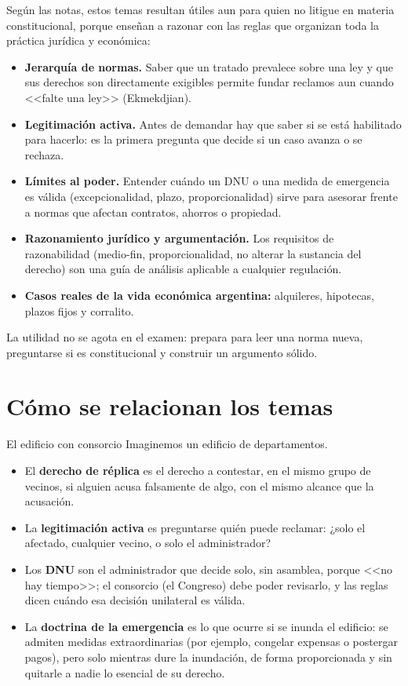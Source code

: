 \documentclass[12pt,oneside]{book}
\begin{document}
Según las notas, estos temas resultan útiles aun para quien no litigue en materia constitucional, porque enseñan a razonar con las reglas que organizan toda la práctica jurídica y económica:

\begin{itemize}
    \item \textbf{Jerarquía de normas.} Saber que un tratado prevalece sobre una ley y que sus derechos son directamente exigibles permite fundar reclamos aun cuando <<falte una ley>> (Ekmekdjian).
    \item \textbf{Legitimación activa.} Antes de demandar hay que saber si se está habilitado para hacerlo: es la primera pregunta que decide si un caso avanza o se rechaza.
    \item \textbf{Límites al poder.} Entender cuándo un DNU o una medida de emergencia es válida (excepcionalidad, plazo, proporcionalidad) sirve para asesorar frente a normas que afectan contratos, ahorros o propiedad.
    \item \textbf{Razonamiento jurídico y argumentación.} Los requisitos de razonabilidad (medio-fin, proporcionalidad, no alterar la sustancia del derecho) son una guía de análisis aplicable a cualquier regulación.
    \item \textbf{Casos reales de la vida económica argentina:} alquileres, hipotecas, plazos fijos y corralito.
\end{itemize}

La utilidad no se agota en el examen: prepara para leer una norma nueva, preguntarse si es constitucional y construir un argumento sólido.

\section{Cómo se relacionan los temas}

\begin{example}{El edificio con consorcio}
Imaginemos un edificio de departamentos.

\begin{itemize}
    \item El \textbf{derecho de réplica} es el derecho a contestar, en el mismo grupo de vecinos, si alguien acusa falsamente de algo, con el mismo alcance que la acusación.
    \item La \textbf{legitimación activa} es preguntarse quién puede reclamar: ¿solo el afectado, cualquier vecino, o solo el administrador?
    \item Los \textbf{DNU} son el administrador que decide solo, sin asamblea, porque <<no hay tiempo>>; el consorcio (el Congreso) debe poder revisarlo, y las reglas dicen cuándo esa decisión unilateral es válida.
    \item La \textbf{doctrina de la emergencia} es lo que ocurre si se inunda el edificio: se admiten medidas extraordinarias (por ejemplo, congelar expensas o postergar pagos), pero solo mientras dure la inundación, de forma proporcionada y sin quitarle a nadie lo esencial de su derecho.
\end{itemize}
\end{example}
\end{document}
